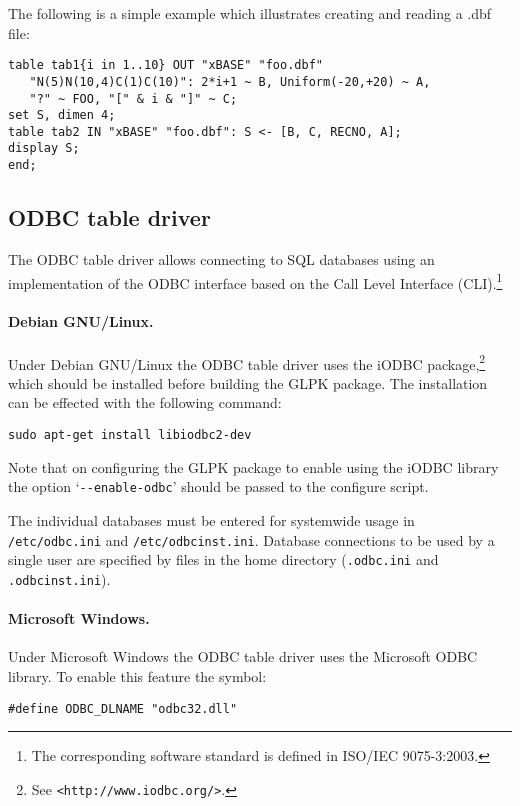 \documentclass[10pt]{article}
\begin{document}
The following is a simple example which illustrates creating and
reading a .dbf file:

\begin{verbatim}
table tab1{i in 1..10} OUT "xBASE" "foo.dbf"
   "N(5)N(10,4)C(1)C(10)": 2*i+1 ~ B, Uniform(-20,+20) ~ A,
   "?" ~ FOO, "[" & i & "]" ~ C;
set S, dimen 4;
table tab2 IN "xBASE" "foo.dbf": S <- [B, C, RECNO, A];
display S;
end;
\end{verbatim}

\subsection{ODBC table driver}

The ODBC table driver allows connecting to SQL databases using an
implementation of the ODBC interface based on the Call Level Interface
(CLI).\footnote{The corresponding software standard is defined in
ISO/IEC 9075-3:2003.}

\paragraph{Debian GNU/Linux.}
Under Debian GNU/Linux the ODBC table driver uses the iODBC
package,\footnote{See {\tt<http://www.iodbc.org/>}.} which should be
installed before building the GLPK package. The installation can be
effected with the following command:

\begin{verbatim}
sudo apt-get install libiodbc2-dev
\end{verbatim}

Note that on configuring the GLPK package to enable using the iODBC
library the option `\verb|--enable-odbc|' should be passed to the
configure script.

The individual databases must be entered for systemwide usage in
\linebreak \verb|/etc/odbc.ini| and \verb|/etc/odbcinst.ini|. Database
connections to be used by a single user are specified by files in the
home directory (\verb|.odbc.ini| and \verb|.odbcinst.ini|).

\paragraph{Microsoft Windows.}
Under Microsoft Windows the ODBC table driver uses the Microsoft ODBC
library. To enable this feature the symbol:

\begin{verbatim}
#define ODBC_DLNAME "odbc32.dll"
\end{verbatim}
\end{document}
